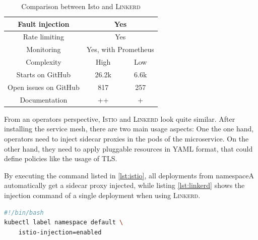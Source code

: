 \begin{table}
\begin{tabular*}{\columnwidth}{c|c|c}
Fault injection                  & \multicolumn{2}{c}{Yes}                                                                                                          \\\hline
Rate limiting                    & \multicolumn{2}{c}{Yes}                                                                                                          \\\hline
Monitoring                       & \multicolumn{2}{c}{Yes, with Prometheus}                                                                                         \\\hline
Complexity                       & High                                                                                                               & Low         \\\hline
Starts on GitHub \cite{linkerd-github} \cite{istio-github}              & 26.2k & 6.6k        \\\hline
Open issues on GitHub \cite{linkerd-github} \cite{istio-github}                 & 817                                                                                                                & 257         \\\hline
Documentation                    & ++                                                                                                                 & +          
\end{tabular*}
\vspace{0.25mm}
\caption{Comparison between Isto and \textsc{Linkerd}}
\label{tab:istio-linkerd}
\end{table}


%
%
%
%

From an operators perspective, \textsc{Istio} and \textsc{Linkerd} look quite similar. After installing the service mesh, there are two main usage aspects: One the one hand, operators need to inject sidecar proxies in the pods of the microservice. On the other hand, they need to apply pluggable resources in YAML format, that could define policies like the usage of TLS.

By executing the command listed in \ref{lst:istio}, all deployments from namespaceA automatically get a sidecar proxy injected, while listing \ref{lst:linkerd} shows the injection command of a single deployment when using \textsc{Linkerd}.

\begin{lstlisting}[language=bash,caption={Injection of sidecards into deployments of a namespace in \textsc{Istio}},label={lst:istio}]
#!/bin/bash
kubectl label namespace default \
	istio-injection=enabled
\end{lstlisting}

